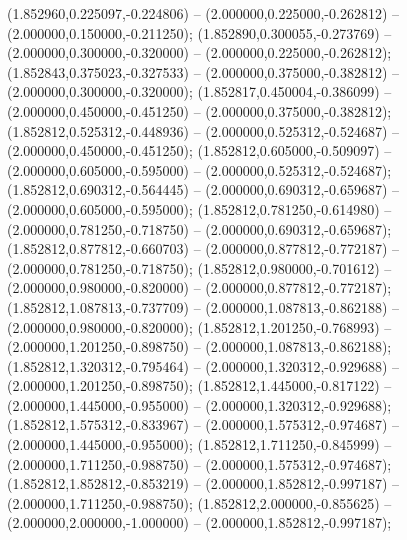  (1.852960,0.225097,-0.224806) -- (2.000000,0.225000,-0.262812) -- (2.000000,0.150000,-0.211250);
 (1.852890,0.300055,-0.273769) -- (2.000000,0.300000,-0.320000) -- (2.000000,0.225000,-0.262812);
 (1.852843,0.375023,-0.327533) -- (2.000000,0.375000,-0.382812) -- (2.000000,0.300000,-0.320000);
 (1.852817,0.450004,-0.386099) -- (2.000000,0.450000,-0.451250) -- (2.000000,0.375000,-0.382812);
 (1.852812,0.525312,-0.448936) -- (2.000000,0.525312,-0.524687) -- (2.000000,0.450000,-0.451250);
 (1.852812,0.605000,-0.509097) -- (2.000000,0.605000,-0.595000) -- (2.000000,0.525312,-0.524687);
 (1.852812,0.690312,-0.564445) -- (2.000000,0.690312,-0.659687) -- (2.000000,0.605000,-0.595000);
 (1.852812,0.781250,-0.614980) -- (2.000000,0.781250,-0.718750) -- (2.000000,0.690312,-0.659687);
 (1.852812,0.877812,-0.660703) -- (2.000000,0.877812,-0.772187) -- (2.000000,0.781250,-0.718750);
 (1.852812,0.980000,-0.701612) -- (2.000000,0.980000,-0.820000) -- (2.000000,0.877812,-0.772187);
 (1.852812,1.087813,-0.737709) -- (2.000000,1.087813,-0.862188) -- (2.000000,0.980000,-0.820000);
 (1.852812,1.201250,-0.768993) -- (2.000000,1.201250,-0.898750) -- (2.000000,1.087813,-0.862188);
 (1.852812,1.320312,-0.795464) -- (2.000000,1.320312,-0.929688) -- (2.000000,1.201250,-0.898750);
 (1.852812,1.445000,-0.817122) -- (2.000000,1.445000,-0.955000) -- (2.000000,1.320312,-0.929688);
 (1.852812,1.575312,-0.833967) -- (2.000000,1.575312,-0.974687) -- (2.000000,1.445000,-0.955000);
 (1.852812,1.711250,-0.845999) -- (2.000000,1.711250,-0.988750) -- (2.000000,1.575312,-0.974687);
 (1.852812,1.852812,-0.853219) -- (2.000000,1.852812,-0.997187) -- (2.000000,1.711250,-0.988750);
 (1.852812,2.000000,-0.855625) -- (2.000000,2.000000,-1.000000) -- (2.000000,1.852812,-0.997187);
